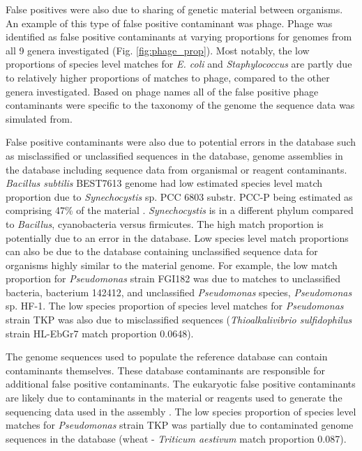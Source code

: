 \documentclass[fleqn,10pt,lineno]{wlpeerj}\usepackage[]{graphicx}\usepackage[]{color}
\begin{document}
False positives were also due to sharing of genetic material between organisms. An example of this type of false positive contaminant was phage. 
Phage was identified as false positive contaminants at varying proportions for genomes from all 9 genera investigated (Fig. \ref{fig:phage_prop}). 
Most notably, the low proportions of species level matches for \textit{E. coli} and \textit{Staphylococcus} are partly due to relatively higher proportions of matches to phage, compared to the other genera investigated. 
Based on phage names all of the false positive phage contaminants were specific to the taxonomy of the genome the sequence data was simulated from. 

False positive contaminants were also due to potential errors in the database such as misclassified or unclassified sequences in the database, genome assemblies in the database including sequence data from organismal or reagent contaminants. 
\textit{Bacillus subtilis} BEST7613 genome had low estimated species level match proportion due to \textit{Synechocystis} sp. PCC 6803 substr. PCC-P being estimated as comprising 47\% of the material  \citep{kanesaki2012identification}. \textit{Synechocystis} is in a different phylum compared to \textit{Bacillus}, cyanobacteria versus firmicutes. 
The high match proportion is potentially due to an error in the database. 
Low species level match proportions can also be due to the database containing unclassified sequence data for organisms highly similar to the material genome. 
For example, the low match proportion for \textit{Pseudomonas} strain FGI182 was due to matches to unclassified bacteria, bacterium 142412, and unclassified \textit{Pseudomonas} species, \textit{Pseudomonas} sp. HF-1. 
The low species proportion of species level matches for \textit{Pseudomonas} strain TKP was also due to misclassified sequences (\textit{Thioalkalivibrio sulfidophilus} strain HL-EbGr7 match proportion 0.0648).

The genome sequences used to populate the reference database can contain contaminants themselves. 
These database contaminants are responsible for additional false positive contaminants.
The eukaryotic false positive contaminants are likely due to contaminants in the material or reagents used to generate the sequencing data used in the assembly \citep{parks2015checkm}. 
The low species proportion of species level matches for \textit{Pseudomonas} strain TKP was partially due to contaminated genome sequences in the database (wheat - \textit{Triticum aestivum} match proportion 0.087). 
\end{document}
